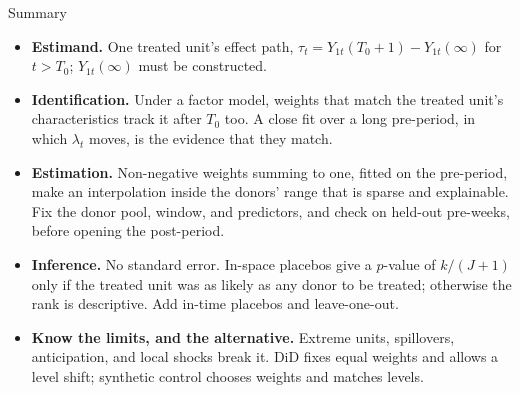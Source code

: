 \documentclass[aspectratio=169, 11pt, handout]{beamer}
\newcommand{\spinestep}[1]{\textcolor{sbgreen}{\textbf{#1}}}
\begin{document}
\begin{frame}{Summary}

\begin{itemize}
  \item \spinestep{Estimand.} One treated unit's effect path, $\tau_t = Y_{1t}(T_0 + 1) - Y_{1t}(\infty)$ for $t > T_0$; $Y_{1t}(\infty)$ must be constructed.
  \item \spinestep{Identification.} Under a factor model, weights that match the treated unit's characteristics track it after $T_0$ too. A close fit over a long pre-period, in which $\lambda_t$ moves, is the evidence that they match.
  \item \spinestep{Estimation.} Non-negative weights summing to one, fitted on the pre-period, make an interpolation inside the donors' range that is sparse and explainable. Fix the donor pool, window, and predictors, and check on held-out pre-weeks, before opening the post-period.
  \item \spinestep{Inference.} No standard error. In-space placebos give a $p$-value of $k/(J+1)$ only if the treated unit was as likely as any donor to be treated; otherwise the rank is descriptive. Add in-time placebos and leave-one-out.
  \item \textbf{Know the limits, and the alternative.} Extreme units, spillovers, anticipation, and local shocks break it. DiD fixes equal weights and allows a level shift; synthetic control chooses weights and matches levels.
\end{itemize}
\end{frame}
\end{document}
